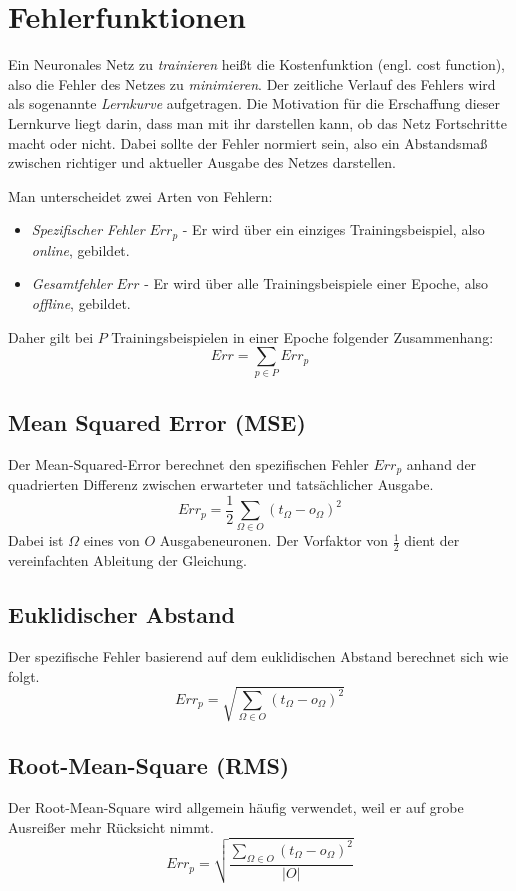 \section*{Fehlerfunktionen}
Ein Neuronales Netz zu \emph{trainieren} heißt die Kostenfunktion (engl. cost function), also die Fehler des Netzes zu \emph{minimieren}.
Der zeitliche Verlauf des Fehlers wird als sogenannte \emph{Lernkurve} aufgetragen. Die Motivation für die Erschaffung dieser Lernkurve liegt darin, dass man mit ihr darstellen kann, ob das Netz Fortschritte macht oder nicht. Dabei sollte der Fehler normiert sein, also ein Abstandsmaß zwischen richtiger und aktueller Ausgabe des Netzes darstellen.

Man unterscheidet zwei Arten von Fehlern:
\begin{itemize}
	\item \emph{Spezifischer Fehler} $Err_p$ - Er wird über ein einziges Trainingsbeispiel, also \emph{online}, gebildet.
	\item \emph{Gesamtfehler} $Err$ - Er wird über alle Trainingsbeispiele einer Epoche, also \emph{offline}, gebildet.
\end{itemize}
Daher gilt bei $P$ Trainingsbeispielen in einer Epoche folgender Zusammenhang:
\[
	Err = \sum_{p \in P} Err_p
\]

\subsection*{Mean Squared Error (MSE)}
Der Mean-Squared-Error berechnet den spezifischen Fehler $Err_p$ anhand der quadrierten Differenz zwischen erwarteter und tatsächlicher Ausgabe.
\[
	Err_p = \frac{1}{2} \sum_{\Omega \in O} ( t_{\Omega} - o_{\Omega})^2
\]
Dabei ist $\Omega$ eines von $O$ Ausgabeneuronen. Der Vorfaktor von $\frac{1}{2}$ dient der vereinfachten Ableitung der Gleichung.

\subsection*{Euklidischer Abstand}
Der spezifische Fehler basierend auf dem euklidischen Abstand berechnet sich wie folgt.
\[
	Err_p = \sqrt{ \sum_{\Omega \in O} ( t_{\Omega} - o_{\Omega})^2 }
\]

\subsection*{Root-Mean-Square (RMS)}
Der Root-Mean-Square wird allgemein häufig verwendet, weil er auf grobe Ausreißer mehr Rücksicht nimmt.
\[
	Err_p = \sqrt{ \frac{
		\sum_{\Omega \in O} ( t_{\Omega} - o_{\Omega})^2 }
		{|O|}
		}
\]


